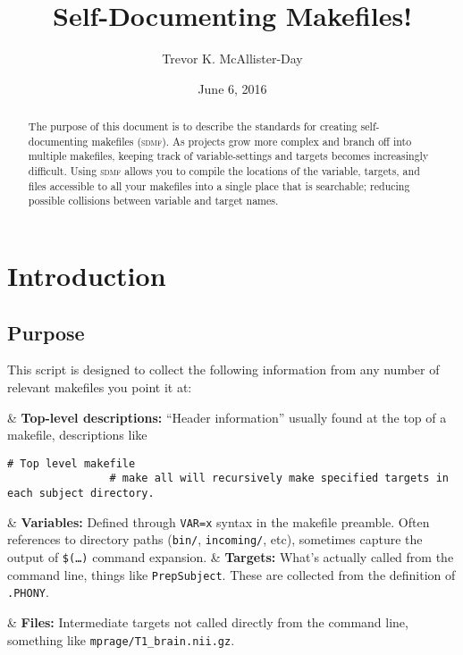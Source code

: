 \documentclass[oneside,11pt]{article}
\title{Self-Documenting Makefiles!}
\author{Trevor K. McAllister-Day}
\affil{\url{tkmday@uw.edu}}
\date{June 6, 2016}
\newcommand{\sdmf}{\textsc{sdmf}}
\begin{document}
	
	\maketitle
	
	
	\begin{abstract}
		The purpose of this document is to describe the standards for creating self-documenting makefiles (\sdmf). As projects grow more complex and branch off into multiple makefiles, keeping track of variable-settings and targets becomes increasingly difficult. Using \sdmf{} allows you to compile the locations of the variable, targets, and files accessible to all your makefiles into a single place that is searchable; reducing possible collisions between variable and target names.
	\end{abstract}
	
	\section{Introduction}
	
	\subsection{Purpose}
	
	This script is designed to collect the following information from any number of relevant makefiles you point it at:
	
	\begin{easylist}[itemize]
		& \textbf{Top-level descriptions:} ``Header information'' usually found at the top of a makefile, descriptions like
			\begin{lstlisting}[basicstyle=\ttfamily, gobble=24, breaklines=true]
				# Top level makefile
				# make all will recursively make specified targets in each subject directory.
			\end{lstlisting}
		& \textbf{Variables:} Defined through \texttt{VAR=x} syntax in the makefile preamble. Often references to directory paths (\texttt{bin/}, \texttt{incoming/}, etc), sometimes capture the output of \texttt{\$(\ldots)} command expansion.
		& \textbf{Targets:} What's actually called from the command line, things like \texttt{PrepSubject}. These are collected from the definition of \texttt{.PHONY}. 
			\begin{center}
			\end{center}
		& \textbf{Files:} Intermediate targets not called directly from the command line, something like \texttt{mprage/T1\_brain.nii.gz}.
	\end{easylist}
	
\end{document}

